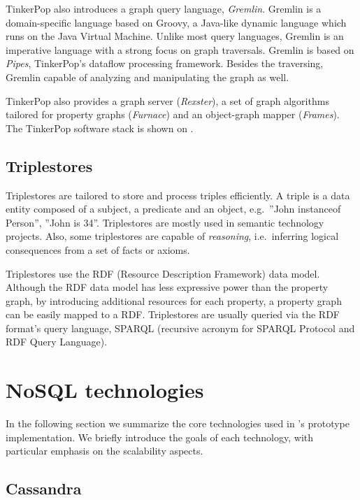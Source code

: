
TinkerPop also introduces a graph query language, \textit{Gremlin}. Gremlin is a domain-specific language based on Groovy, a Java-like dynamic language which runs on the Java Virtual Machine. Unlike most query languages, Gremlin is an imperative language with a strong focus on graph traversals. Gremlin is based on \textit{Pipes}, TinkerPop's dataflow processing framework. Besides the traversing, Gremlin capable of analyzing and manipulating the graph as well.

TinkerPop also provides a graph server (\textit{Rexster}), a set of graph algorithms tailored for property graphs (\textit{Furnace}) and an object-graph mapper (\textit{Frames}). The TinkerPop software stack is shown on .


\subsection{Triplestores}

Triplestores are tailored to store and process triples efficiently. A triple is a data entity composed of a subject, a predicate and an object, e.g.\ ''John instanceof Person'', ''John is 34''. Triplestores are mostly used in semantic technology projects. Also, some triplestores are capable of \emph{reasoning}, i.e.\ inferring logical consequences from a set of facts or axioms. 

Triplestores use the RDF (Resource Description Framework) data model. Although the RDF data model has less expressive power than the property graph, by introducing additional resources for each property, a property graph can be easily mapped to a RDF. Triplestores are usually queried via the RDF format's query language, SPARQL (recursive acronym for SPARQL Protocol and RDF Query Language). 

\section{NoSQL technologies}

In the following section we summarize the core technologies used in \iqd's prototype implementation. We briefly introduce the goals of each technology, with particular emphasis on the scalability aspects.

\subsection{Cassandra}

